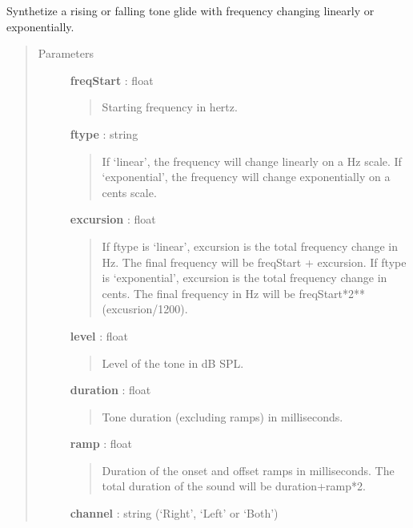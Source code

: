 \documentclass[a4paper,12pt,english]{sphinxmanual}
\begin{document}
\begin{fulllineitems}
\label{sndlib:sndlib.glide}
Synthetize a rising or falling tone glide with frequency changing
linearly or exponentially.
\begin{quote}\begin{description}
\item[{Parameters }] \leavevmode
\textbf{freqStart} : float
\begin{quote}

Starting frequency in hertz.
\end{quote}

\textbf{ftype} : string
\begin{quote}

If `linear', the frequency will change linearly on a Hz scale.
If `exponential', the frequency will change exponentially on a cents scale.
\end{quote}

\textbf{excursion} : float
\begin{quote}

If ftype is `linear', excursion is the total frequency change in Hz.
The final frequency will be freqStart + excursion.
If ftype is `exponential', excursion is the total frequency change in cents.
The final frequency in Hz will be freqStart*2**(excusrion/1200).
\end{quote}

\textbf{level} : float
\begin{quote}

Level of the tone in dB SPL.
\end{quote}

\textbf{duration} : float
\begin{quote}

Tone duration (excluding ramps) in milliseconds.
\end{quote}

\textbf{ramp} : float
\begin{quote}

Duration of the onset and offset ramps in milliseconds.
The total duration of the sound will be duration+ramp*2.
\end{quote}

\textbf{channel} : string (`Right', `Left' or `Both')
\begin{quote}


\end{quote}
\end{description}
\end{quote}
\end{fulllineitems}
\end{document}
